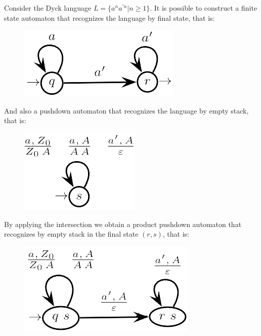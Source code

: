 \begin{example}
    Consider the Dyck language $L=\{a^na^{'n}| n \geq 1\}$. 
    It is possible to construct a finite state automaton that recognizes the language by final state, that is: 
    \begin{figure}[H]
        \centering
        \includegraphics[width=0.25\linewidth]{images/pdaint.png}
    \end{figure}
    And also a pushdown automaton that recognizes the language by empty stack, that is: 
    \begin{figure}[H]
        \centering
        \includegraphics[width=0.25\linewidth]{images/pdaint1.png}
    \end{figure}
    By applying the intersection we obtain a product pushdown automaton that recognizes by empty stack in the final state $(r,s)$, that is: 
    \begin{figure}[H]
        \centering
        \includegraphics[width=0.3\linewidth]{images/pdaint2.png}
    \end{figure}
\end{example}